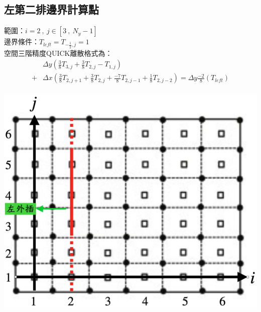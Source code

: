 \documentclass[12pt]{article}
\begin{document}
\subsection{左第二排邊界計算點}
 \begin{minipage}{0.6\textwidth}
   \noindent 範圍：$i=2\ ,\ j\in[3\ ,\ N_{y}-1]$\\[1.5ex]
   \noindent 邊界條件：$T_{left} = T_{-\frac{1}{2},j}= 1$\\[1.5ex]
   \noindent 空間三階精度QUICK離散格式為：
   \begin{equation*}\label{eq:QUICK5}\begin{split}
     &\Delta y(\frac{3}{8}T_{3,j} + \frac{3}{8}T_{2,j} -T_{1,j})\\[1.5ex] 
    +& \Delta x (\frac{3}{8}T_{2,j+1} + \frac{3}{8}T_{2,j} +  \frac{-7}{8}T_{2,j-1}+ \frac{1}{8}T_{2,j-2}) =\Delta y \frac{-2}{8}(T_{left}) \\[1.5ex]
   \end{split}\end{equation*}
   \end{minipage}%
   \hfill
   \begin{minipage}{0.34\textwidth}
   \centering
   \includegraphics[width=\linewidth,height=9\baselineskip]{18.png}
   \label{fig:5boundary}
\end{minipage}
\end{document}
